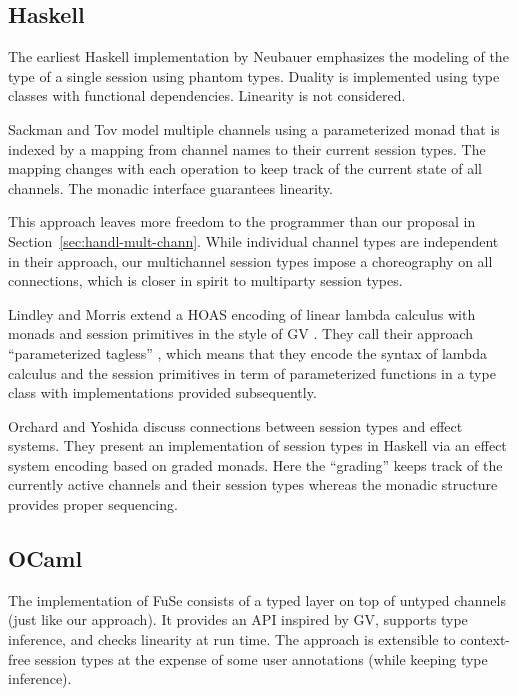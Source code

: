 \documentclass[acmsmall,screen]{acmart}
\begin{document}
\subsection{Haskell}
\label{sec:hask-impl}

The earliest Haskell implementation by Neubauer \cite{DBLP:conf/padl/NeubauerT04}
emphasizes the modeling of the type of a single session using phantom
types. Duality is implemented using type classes with functional
dependencies. Linearity is not considered.

Sackman \cite{SackmanE08} and Tov \cite{DBLP:conf/popl/TovP11} model
multiple channels using a parameterized monad that is indexed by a mapping
from channel names to their current session types. The mapping changes
with each operation to keep track of the current state of all
channels. The monadic interface guarantees linearity.

This approach leaves more freedom to the programmer than our proposal
in Section~\ref{sec:handl-mult-chann}. While individual channel types
are independent in their approach, our multichannel session types
impose a choreography on all connections, which is closer in spirit to
multiparty session types. 

Lindley and Morris \cite{DBLP:conf/haskell/LindleyM16} extend a HOAS
encoding of linear lambda calculus with monads and session primitives
in the style of GV \cite{DBLP:journals/jfp/GayV10}. They call their approach
``parameterized tagless'' \cite{DBLP:journals/jfp/CaretteKS09}, which means that they encode the syntax of
lambda calculus and the session primitives in term of parameterized
functions in a type class with implementations provided subsequently.

Orchard and Yoshida \cite{DBLP:conf/popl/OrchardY16} discuss
connections between session types and effect systems. They present an
implementation of session types in Haskell via an effect system
encoding based on graded monads. Here the ``grading'' keeps track of
the currently active channels and their session types whereas the
monadic structure provides proper sequencing.


\subsection{OCaml}
\label{sec:ocaml}

The implementation of FuSe \cite{DBLP:journals/jfp/Padovani17}
consists of a typed layer on top of untyped channels (just like our
approach).  It provides an API inspired by GV, supports
type inference, and checks linearity at run time. The approach is
extensible to context-free session types
\cite{DBLP:journals/toplas/Padovani19} at the expense of some user
annotations (while keeping type inference).
\end{document}
